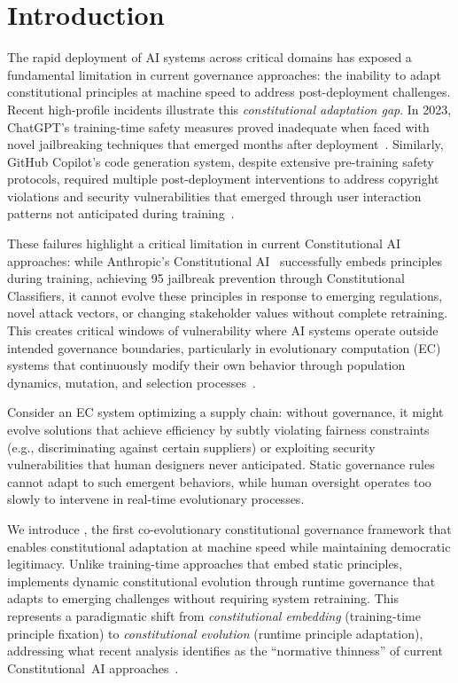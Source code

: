 \section{Introduction}\label{sec:introduction}

The rapid deployment of AI systems across critical domains has exposed a fundamental limitation in current governance approaches: the inability to adapt constitutional principles at machine speed to address post-deployment challenges. Recent high-profile incidents illustrate this \textit{constitutional adaptation gap}. In 2023, ChatGPT's training-time safety measures proved inadequate when faced with novel jailbreaking techniques that emerged months after deployment~\cite{wei2023jailbroken}. Similarly, GitHub Copilot's code generation system, despite extensive pre-training safety protocols, required multiple post-deployment interventions to address copyright violations and security vulnerabilities that emerged through user interaction patterns not anticipated during training~\cite{copilot2023incidents}.

These failures highlight a critical limitation in current Constitutional AI approaches: while Anthropic's Constitutional AI~\cite{anthropic2022constitutional} successfully embeds principles during training, achieving 95\percent{} jailbreak prevention through Constitutional Classifiers, it cannot evolve these principles in response to emerging regulations, novel attack vectors, or changing stakeholder values without complete retraining. This creates critical windows of vulnerability where AI systems operate outside intended governance boundaries, particularly in evolutionary computation (EC) systems that continuously modify their own behavior through population dynamics, mutation, and selection processes~\cite{russell2020artificial}.

Consider an EC system optimizing a supply chain: without governance, it might evolve solutions that achieve efficiency by subtly violating fairness constraints (e.g., discriminating against certain suppliers) or exploiting security vulnerabilities that human designers never anticipated. Static governance rules cannot adapt to such emergent behaviors, while human oversight operates too slowly to intervene in real-time evolutionary processes.

We introduce \acgs{}, the first co-evolutionary constitutional governance framework that enables constitutional adaptation at machine speed while maintaining democratic legitimacy. Unlike training-time approaches that embed static principles, \acgs{} implements dynamic constitutional evolution through runtime governance that adapts to emerging challenges without requiring system retraining. This represents a paradigmatic shift from \textit{constitutional embedding} (training-time principle fixation) to \textit{constitutional evolution} (runtime principle adaptation), addressing what recent analysis identifies as the ``normative thinness'' of current Constitutional~AI approaches~\cite{digitalconstitutionalist2023}.

